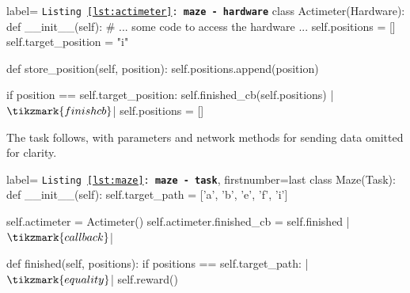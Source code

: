 \begin{listing}[h!]
\begin{pythoncode*}{label= \texttt{Listing \ref{lst:actimeter}: \textbf{maze - hardware}}}
class Actimeter(Hardware):
    def __init__(self):
        # ... some code to access the hardware ...
        self.positions = []
        self.target_position = "i"
        
    def store_position(self, position):
        self.positions.append(position)
        
        if position == self.target_position:
            self.finished_cb(self.positions) |$\tikzmark{finishcb}$|
            self.positions = []
\end{pythoncode*}
\captionlistentry{}%
\label{lst:actimeter}%
\end{listing}%
%
%
The task follows, with parameters and network methods for sending data omitted for clarity.

\begin{listing}[h!]
\begin{pythoncode*}{label= \texttt{Listing \ref{lst:maze}: \textbf{maze - task}}, firstnumber=last}
class Maze(Task):
    def __init__(self):
        self.target_path = ['a', 'b', 'e', 'f', 'i']
        
        self.actimeter = Actimeter()
        self.actimeter.finished_cb = self.finished |$\tikzmark{callback}\label{callback}$|
        
    def finished(self, positions):
        if positions == self.target_path: |$\tikzmark{equality}$|
            self.reward()
\end{pythoncode*}
\captionlistentry{}%
\label{lst:maze}%
\end{listing}

